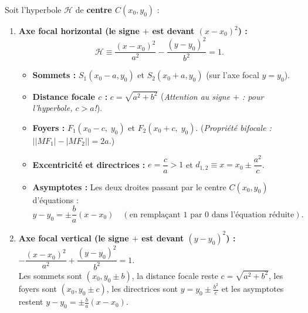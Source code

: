 \begin{theoreme}
Soit l'hyperbole $\mathcal{H}$ de \textbf{centre $C(x_0, y_0)$} :
\begin{enumerate}
    \item \textbf{Axe focal horizontal (le signe $+$ est devant $(x-x_0)^2$) :}
    \[
        \boxed{\mathcal{H} \equiv \frac{(x - x_0)^2}{a^2} - \frac{(y - y_0)^2}{b^2} = 1}.
    \]
    \begin{itemize}
        \item \textbf{Sommets :} $S_1(x_0 - a, y_0)$ et $S_2(x_0 + a, y_0)$ (sur l'axe focal $y = y_0$).
        \item \textbf{Distance focale $c$ :} $\boxed{c = \sqrt{a^2 + b^2}}$ \quad (\emph{Attention au signe $+$ : pour l'hyperbole, $c > a$!}).
        \item \textbf{Foyers :} $F_1(x_0 - c,\; y_0)$ et $F_2(x_0 + c,\; y_0)$. \quad (\emph{Propriété bifocale :} $\bigl||MF_1| - |MF_2|\bigr| = 2a$.)
        \item \textbf{Excentricité et directrices :} $e = \dfrac{c}{a} > 1$ \quad et \quad $\boxed{d_{1,2} \equiv x = x_0 \pm \dfrac{a^2}{c}}$.
        \item \textbf{Asymptotes :} Les deux droites passant par le centre $C(x_0,y_0)$ d'équations :
        \[
            \boxed{y - y_0 = \pm \frac{b}{a}(x - x_0)} \quad \left(\text{en remplaçant $1$ par $0$ dans l'équation réduite}\right).
        \]
    \end{itemize}
    \item \textbf{Axe focal vertical (le signe $+$ est devant $(y-y_0)^2$) :} $-\dfrac{(x-x_0)^2}{a^2} + \dfrac{(y-y_0)^2}{b^2} = 1$.\\
    Les sommets sont $(x_0, y_0 \pm b)$, la distance focale reste $c = \sqrt{a^2+b^2}$, les foyers sont $(x_0, y_0 \pm c)$, les directrices sont $y = y_0 \pm \frac{b^2}{c}$ et les asymptotes restent $y - y_0 = \pm \frac{b}{a}(x - x_0)$.
\end{enumerate}
\end{theoreme}

